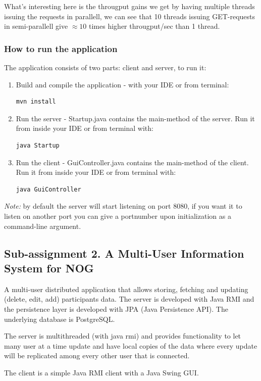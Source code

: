 \documentclass[a4paper, 11pt]{article}
\begin{document}
What's interesting here is the througput gains we get by having multiple threads issuing the requests in parallell, we can see that 10 threads issuing GET-requests in semi-parallell give $\approx 10$ times higher througput/sec than 1 thread.
\subsubsection{How to run the application}
The application consists of two parts: client and server, to run it:
\begin{enumerate}
\item Build and compile the application - with your IDE or from terminal:
\begin{verbatim}
mvn install
\end{verbatim}
\item Run the server - Startup.java contains the main-method of the server. Run it from inside your IDE or from terminal with: 
\begin{verbatim}
java Startup
\end{verbatim}
\item Run the client - GuiController.java contains the main-method of the client. Run it from inside your IDE or from terminal with: 
\begin{verbatim}
java GuiController
\end{verbatim}
\end{enumerate}
\textit{Note:} by default the server will start listening on port 8080, if you want it to listen on another port you can give a portnumber upon initialization as a command-line argument.
\subsection{Sub-assignment 2. A Multi-User Information System for NOG}
A multi-user distributed application that allows storing, fetching and updating (delete, edit, add) participants data. The server is developed with Java RMI and the persistence layer is developed with JPA (Java Persistence API). The underlying database is PostgreSQL.

The server is multithreaded (with java rmi) and provides functionality to let many user at a time update and have local copies of the data where every update will be replicated among every other user that is connected.

The client is a simple Java RMI client with a Java Swing GUI.
\end{document}
